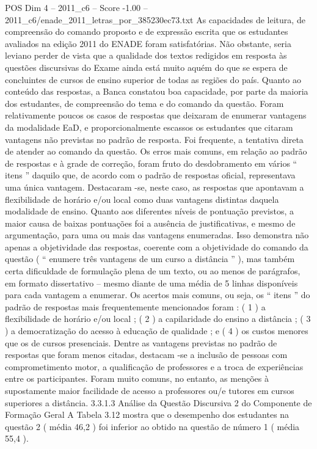 \begin{textsample}{POS Dim 4 – 2011\_c6 – Score -1.00 – 2011\_c6/enade\_2011\_letras\_por\_385230ec73.txt}
As capacidades de leitura, de compreensão do comando proposto e de expressão escrita que os estudantes avaliados na edição 2011 do ENADE foram satisfatórias.
Não obstante, seria leviano perder de vista que a qualidade dos textos redigidos em resposta às questões discursivas do Exame ainda está muito aquém do que se espera de concluintes de cursos de ensino superior de todas as regiões do país.
Quanto ao conteúdo das respostas, a Banca constatou boa capacidade, por parte da maioria dos estudantes, de compreensão do tema e do comando da questão.
Foram relativamente poucos os casos de respostas que deixaram de enumerar vantagens da modalidade EaD, e proporcionalmente escassos os estudantes que citaram vantagens não previstas no padrão de resposta.
Foi frequente, a tentativa direta de atender ao comando da questão.
Os erros mais comuns, em relação ao padrão de respostas e à grade de correção, foram fruto do desdobramento em vários “ itens ” daquilo que, de acordo com o padrão de respostas oficial, representava uma única vantagem.
Destacaram -se, neste caso, as respostas que apontavam a flexibilidade de horário e/ou local como duas vantagens distintas daquela modalidade de ensino.
Quanto aos diferentes níveis de pontuação previstos, a maior causa de baixas pontuações foi a ausência de justificativas, e mesmo de argumentação, para uma ou mais das vantagens enumeradas.
Isso demonstra não apenas a objetividade das respostas, coerente com a objetividade do comando da questão ( “ enumere três vantagens de um curso a distância ” ), mas também certa dificuldade de formulação plena de um texto, ou ao menos de parágrafos, em formato dissertativo – mesmo diante de uma média de 5 linhas disponíveis para cada vantagem a enumerar.
Os acertos mais comuns, ou seja, os “ itens ” do padrão de respostas mais frequentemente mencionados foram : ( 1 ) a flexibilidade de horário e/ou local ; ( 2 ) a capilaridade do ensino a distância ; ( 3 ) a democratização do acesso à educação de qualidade ; e ( 4 ) os custos menores que os de cursos presenciais.
Dentre as vantagens previstas no padrão de respostas que foram menos citadas, destacam -se a inclusão de pessoas com comprometimento motor, a qualificação de professores e a troca de experiências entre os participantes.
Foram muito comuns, no entanto, as menções à supostamente maior facilidade de acesso a professores ou/e tutores em cursos superiores a distância. 3.3.1.3 Análise da Questão Discursiva 2 do Componente de Formação Geral A Tabela 3.12 mostra que o desempenho dos estudantes na questão 2 ( média 46,2 ) foi inferior ao obtido na questão de número 1 ( média 55,4 ).

\end{textsample}
